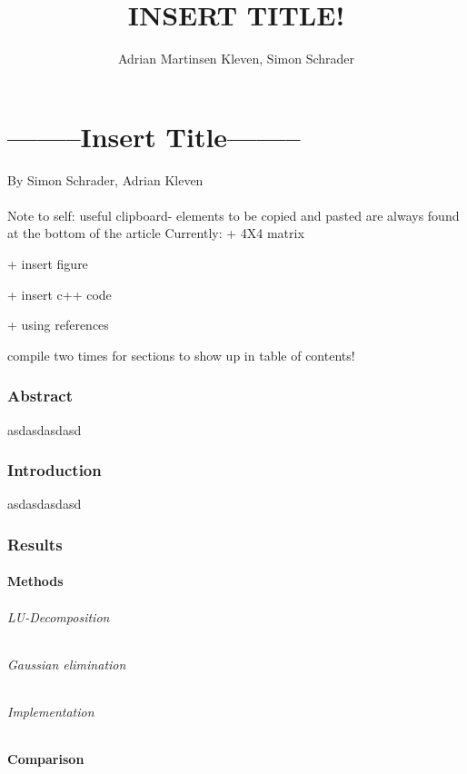 \documentclass[10pt,a4paper]{article}
\author{Adrian Martinsen Kleven, Simon Schrader}
\title{INSERT TITLE!}
\begin{document}
\part*{--------Insert Title--------}
{\large By Simon Schrader, Adrian Kleven}\\\\
Note to self: 
useful clipboard- elements to be copied and pasted are always found at the bottom of the article
Currently:
 + 4X4 matrix 

 + insert figure

 + insert c++ code
 
 + using references
 
 compile two times for sections to show up in table of contents!


\tableofcontents

\listoffigures
\listoftables

 
\clearpage
 
\section{Abstract}
asdasdasdasd
\section{Introduction}
asdasdasdasd
\section{Results}

\subsection{Methods}
\paragraph{LU-Decomposition}

\paragraph{Gaussian elimination}

\paragraph{Implementation}


\subsection{Comparison}
\end{document}
